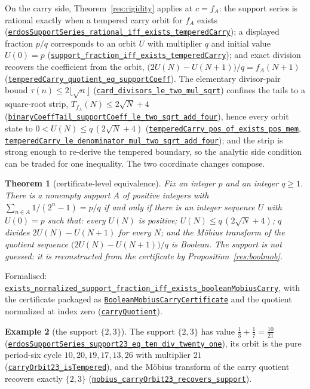 \documentclass[11pt]{article}
\newcommand{\commit}{81150c1c6fdd4cd51e76d3aa0de344341e0e9e7c}
\newcommand{\repobase}{https://github.com/wcook04/plectis-lean-erdos249-257/blob/\commit}
\newcommand{\PK}{Erdos249257}
\newcommand{\lref}[3]{\href{\repobase/\PK/#1\#L#2}{\nolinkurl{#3}}}
\newcommand{\lrefx}[3]{\href{\repobase/\PK/#1\#L#2}{\nolinkurl{#3}}}
\newtheorem{theorem}{Theorem}[section]
\theoremstyle{definition}
\newtheorem{example}[theorem]{Example}
\theoremstyle{remark}
\begin{document}
On the carry side, Theorem~\ref{res:rigidity} applies at $c=f_A$: the support
series is rational exactly when a tempered carry orbit for $f_A$ exists
(\lrefx{BooleanMobiusCarry.lean}{383}{erdosSupportSeries_rational_iff_exists_temperedCarry});
a displayed fraction $p/q$ corresponds to an orbit $U$ with multiplier $q$ and
initial value $U(0)=p$
(\lrefx{BooleanMobiusCarry.lean}{466}{support_fraction_iff_exists_temperedCarry});
and exact division recovers the coefficient from the orbit,
$\bigl(2U(N)-U(N+1)\bigr)/q=f_A(N+1)$
(\lrefx{BooleanMobiusCarry.lean}{680}{temperedCarry_quotient_eq_supportCoeff}).
The elementary divisor-pair bound $\tau(n)\le2\lfloor\sqrt n\rfloor$
(\lrefx{BooleanMobiusCarry.lean}{208}{card_divisors_le_two_mul_sqrt}) confines
the tails to a square-root strip, $T_{f_A}(N)\le2\sqrt N+4$
(\lrefx{BooleanMobiusCarry.lean}{289}{binaryCoeffTail_supportCoeff_le_two_sqrt_add_four}),
hence every orbit state to $0<U(N)\le q\,(2\sqrt N+4)$
(\lrefx{BooleanMobiusCarry.lean}{690}{temperedCarry_pos_of_exists_pos_mem},
\lrefx{BooleanMobiusCarry.lean}{705}{temperedCarry_le_denominator_mul_two_sqrt_add_four});
and the strip is strong enough to re-derive the tempered boundary, so the
analytic side condition can be traded for one inequality. The two coordinate
changes compose.

\begin{theorem}[certificate-level equivalence]\label{res:carrycert}
Fix an integer $p$ and an integer $q\ge1$. There is a nonempty support $A$ of
positive integers with $\sum_{n\in A}1/(2^n-1)=p/q$ if and only if there is an
integer sequence $U$ with $U(0)=p$ such that: every $U(N)$ is positive;
$U(N)\le q\,(2\sqrt N+4)$; $q$ divides $2U(N)-U(N+1)$ for every $N$; and the
M\"obius transform of the quotient sequence $\bigl(2U(N)-U(N+1)\bigr)/q$ is
Boolean. The support is not guessed: it is reconstructed from the certificate
by Proposition~\ref{res:boolmob}.
\end{theorem}
\noindent Formalised:
\lref{BooleanMobiusCarry.lean}{948}{exists_normalized_support_fraction_iff_exists_booleanMobiusCarry},
with the certificate packaged as
\lrefx{BooleanMobiusCarry.lean}{775}{BooleanMobiusCarryCertificate} and the
quotient normalized at index zero
(\lrefx{BooleanMobiusCarry.lean}{766}{carryQuotient}).

\begin{example}[the support $\{2,3\}$]
The support $\{2,3\}$ has value
$\tfrac13+\tfrac17=\tfrac{10}{21}$
(\lrefx{BooleanMobiusCarry.lean}{1054}{erdosSupportSeries_support23_eq_ten_div_twenty_one}),
its orbit is the pure period-six cycle $10,20,19,17,13,26$ with multiplier
$21$ (\lrefx{BooleanMobiusCarry.lean}{1103}{carryOrbit23_isTempered}), and the
M\"obius transform of the carry quotient recovers exactly $\{2,3\}$
(\lrefx{BooleanMobiusCarry.lean}{1140}{mobius_carryOrbit23_recovers_support}).
\end{example}
\end{document}
